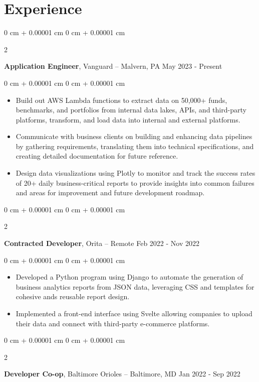 \documentclass[10pt, letterpaper]{article}
\newenvironment{highlights}{
    \begin{itemize}[
        topsep=0.10 cm,
        parsep=0.10 cm,
        partopsep=0pt,
        itemsep=0pt,
        leftmargin=0 cm + 10pt
    ]
}{
    \end{itemize}
} %
\newenvironment{onecolentry}{
    \begin{adjustwidth}{
        0 cm + 0.00001 cm
    }{
        0 cm + 0.00001 cm
    }
}{
    \end{adjustwidth}
} %
\newenvironment{twocolentry}[2][]{
    \onecolentry
    \def\secondColumn{#2}
    \setcolumnwidth{\fill, 4.5 cm}
    \begin{paracol}{2}
}{
    \switchcolumn \raggedleft \secondColumn
    \end{paracol}
    \endonecolentry
} %
\begin{document}
    \section{Experience}
    \begin{twocolentry}{
        May 2023 - Present
    }
    \textbf{Application Engineer}, Vanguard -- Malvern, PA \end{twocolentry}
    \vspace{0.10 cm}
    \begin{onecolentry}
      \begin{highlights}
        \item Build out AWS Lambda functions to extract data on 50,000+ funds, benchmarks, and portfolios from internal data lakes, APIs, and third-party platforms, transform, and load data into internal and external platforms.
        \item Communicate with business clients on building and enhancing data pipelines by gathering requirements, translating them into technical specifications, and creating detailed documentation for future reference.
        \item Design data visualizations using Plotly to monitor and track the success rates of 20+ daily business-critical reports to provide insights into common failures and areas for improvement and future development roadmap.
      \end{highlights}
    \end{onecolentry}
    \vspace{0.2 cm}
    \begin{twocolentry}{
        Feb 2022 - Nov 2022
    }
    \textbf{Contracted Developer}, Orita -- Remote \end{twocolentry}
    \vspace{0.10 cm}
    \begin{onecolentry}
      \begin{highlights}
        \item Developed a Python program using Django to automate the generation of business analytics reports from JSON data, leveraging CSS and templates for cohesive ands reusable report design.
        \item Implemented a front-end interface using Svelte allowing companies to upload their data and connect with third-party e-commerce platforms.
      \end{highlights}
    \end{onecolentry}
    \vspace{0.2 cm}
    \begin{twocolentry}{
        Jan 2022 - Sep 2022
    }
    \textbf{Developer Co-op}, Baltimore Orioles -- Baltimore, MD \end{twocolentry}
\end{document}
